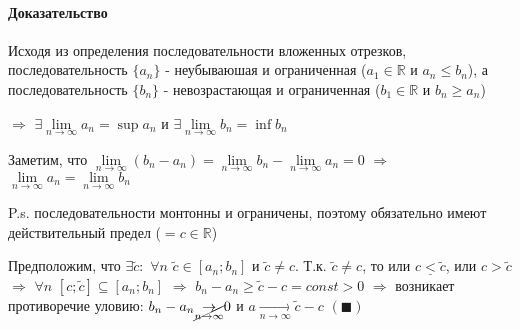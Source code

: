 \documentclass[class=article,a4paper,12pt,crop=false]{standalone}
\begin{document}
\paragraph{Доказательство} Исходя из определения последовательности вложенных отрезков, последовательность
$\{a_n\}$ - неубываюшая и ограниченная ($a_1 \in \mathbb{R}$ и $a_n \leq b_n$), а последовательность
$\{b_n\}$ - невозрастающая и ограниченная ($b_1 \in \mathbb{R}$ и $b_n \geq a_n$)

$\Rightarrow$ $\exists \lim\limits_{n \rightarrow \infty} a_n = \sup{a_n}$ и $\exists \lim\limits_{n \rightarrow \infty} b_n = \inf b_n$

Заметим, что $\lim\limits_{n \rightarrow \infty}(b_n - a_n) = \lim\limits_{n \rightarrow \infty}b_n -
\lim\limits_{n \rightarrow \infty} a_n = 0$ $\Rightarrow$ $\lim\limits_{n \rightarrow \infty} a_n = 
\lim\limits_{n \rightarrow \infty} b_n$ 

P.s. последовательности монтонны и ограничены, поэтому обязательно имеют действительный предел ($= c \in \mathbb{R}$)

Предположим, что $\exists \tilde{c}:$ $\forall n$ $\tilde{c} \in [a_n; b_n]$ и $\tilde{c} \neq c$.
Т.к. $\tilde{c} \neq c$, то или $\underline{c < \tilde{c}}$, или $c > \tilde{c}$
$\Rightarrow$ $\forall n$ $[c; \tilde{c}] \subseteq [a_n; b_n]$ $\Rightarrow$
$b_n - a_n \geq \tilde{c} - c = const > 0$ $\Rightarrow$ возникает противоречие уловию:
$b_n - a_n \cancel{\underset{n \rightarrow \infty}{\rightarrow}} 0$ и
$a \underset{n \rightarrow \infty}{\rightarrow} \tilde{c} - c$ $(\blacksquare)$
\end{document}
